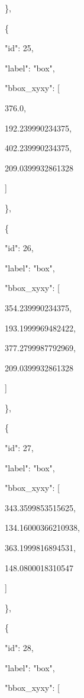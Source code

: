 \documentclass[10pt,a4paper]{article}
\begin{document}
    \},\allowbreak{}\par
    \{\par
      "id":\allowbreak{} 25,\allowbreak{}\par
      "label":\allowbreak{} "box",\allowbreak{}\par
      "bbox\_xyxy":\allowbreak{} [\par
        376.0,\allowbreak{}\par
        192.239990234375,\allowbreak{}\par
        402.239990234375,\allowbreak{}\par
        209.0399932861328\par
      ]\par
    \},\allowbreak{}\par
    \{\par
      "id":\allowbreak{} 26,\allowbreak{}\par
      "label":\allowbreak{} "box",\allowbreak{}\par
      "bbox\_xyxy":\allowbreak{} [\par
        354.239990234375,\allowbreak{}\par
        193.1999969482422,\allowbreak{}\par
        377.2799987792969,\allowbreak{}\par
        209.0399932861328\par
      ]\par
    \},\allowbreak{}\par
    \{\par
      "id":\allowbreak{} 27,\allowbreak{}\par
      "label":\allowbreak{} "box",\allowbreak{}\par
      "bbox\_xyxy":\allowbreak{} [\par
        343.3599853515625,\allowbreak{}\par
        134.16000366210938,\allowbreak{}\par
        363.1999816894531,\allowbreak{}\par
        148.0800018310547\par
      ]\par
    \},\allowbreak{}\par
    \{\par
      "id":\allowbreak{} 28,\allowbreak{}\par
      "label":\allowbreak{} "box",\allowbreak{}\par
      "bbox\_xyxy":\allowbreak{} [\par
\end{document}
